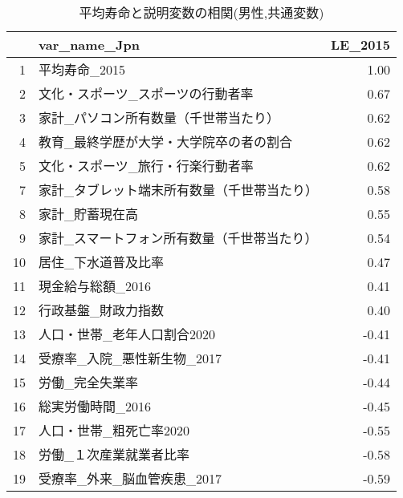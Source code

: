 \begin{table}[H]
\centering
\caption{平均寿命と説明変数の相関(男性,共通変数)}
\label{LE_d_common_m_corr.tex}
\begingroup\tiny

\begin{adjustbox}{width=.5\textwidth}
\begin{tabular}{rlr}
  \hline
 & var\_name\_Jpn & LE\_2015 \\
  \hline
1 & 平均寿命\_2015 & 1.00 \\
  2 & 文化・スポーツ\_スポーツの行動者率 & 0.67 \\
  3 & 家計\_パソコン所有数量（千世帯当たり） & 0.62 \\
  4 & 教育\_最終学歴が大学・大学院卒の者の割合 & 0.62 \\
  5 & 文化・スポーツ\_旅行・行楽行動者率 & 0.62 \\
  7 & 家計\_タブレット端末所有数量（千世帯当たり） & 0.58 \\
  8 & 家計\_貯蓄現在高 & 0.55 \\
  9 & 家計\_スマートフォン所有数量（千世帯当たり） & 0.54 \\
  10 & 居住\_下水道普及比率 & 0.47 \\
  11 & 現金給与総額\_2016 & 0.41 \\
  12 & 行政基盤\_財政力指数 & 0.40 \\
  13 & 人口・世帯\_老年人口割合2020 & -0.41 \\
  14 & 受療率\_入院\_悪性新生物\_2017 & -0.41 \\
  15 & 労働\_完全失業率 & -0.44 \\
  16 & 総実労働時間\_2016 & -0.45 \\
  17 & 人口・世帯\_粗死亡率2020 & -0.55 \\
  18 & 労働\_１次産業就業者比率 & -0.58 \\
  19 & 受療率\_外来\_脳血管疾患\_2017 & -0.59 \\
   \hline
\end{tabular}
\end{adjustbox}

\endgroup
\end{table}
